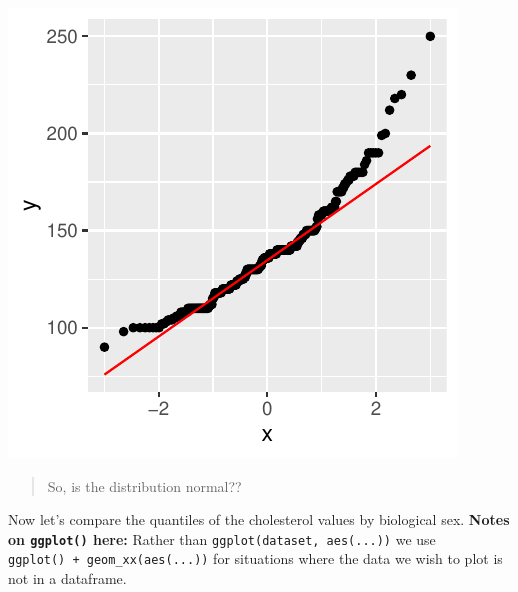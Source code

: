 \documentclass[
]{book}
\begin{document}
\includegraphics{_main_files/figure-latex/unnamed-chunk-52-1.pdf}

\begin{quote}
So, is the distribution normal??
\end{quote}

Now let's compare the quantiles of the cholesterol values by biological sex.
\textbf{Notes on \texttt{ggplot()} here:} Rather than \texttt{ggplot(dataset,\ aes(...))} we use \texttt{ggplot()\ +\ geom\_xx(aes(...))} for situations where the data we wish to plot is not in a dataframe.
\end{document}
